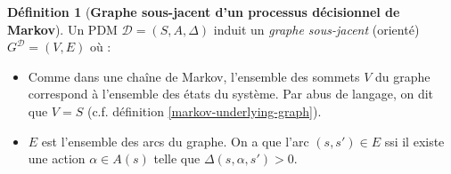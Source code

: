 \documentclass[12pt,a4paper]{report}
\theoremstyle{definition}%
\newtheorem{definition}{Définition}[chapter]
\theoremstyle{remark}
\newcommand{\ssi}{ssi }
\newcommand{\cf}{c.f. }
\let\labelitemi\labelitemii
\begin{document}
\begin{definition}[\textbf{Graphe sous-jacent d'un processus décisionnel de Markov}]
	Un PDM $\mathcal{D} = (S, A, \Delta)$ induit un \textit{graphe sous-jacent} (orienté) $G^\mathcal{D} = (V, E)$ où :
	\begin{itemize}
		\renewcommand{\labelitemi}{\tiny $\bullet$}
		\item Comme dans une chaîne de Markov, l'ensemble des sommets $V$ du graphe correspond à l'ensemble des états du système. Par abus de langage, on dit que $V = S$ (\cf définition \ref{markov-underlying-graph}).
		\item $E$ est l'ensemble des arcs du graphe. On a que l'arc $(s, s') \in E$ \ssi il existe une action $\alpha \in A(s)$ telle que $\Delta(s, \alpha, s') > 0$.
	\end{itemize}
\end{definition}



\end{document}
